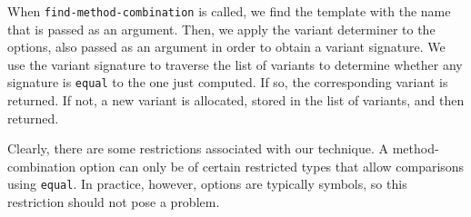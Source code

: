 When \texttt{find-method-combination} is called, we find the template
with the name that is passed as an argument.  Then, we apply the
variant determiner to the options, also passed as an argument in order
to obtain a variant signature.  We use the variant signature to
traverse the list of variants to determine whether any signature is
\texttt{equal} to the one just computed.  If so, the corresponding
variant is returned.  If not, a new variant is allocated, stored in
the list of variants, and then returned.

Clearly, there are some restrictions associated with our technique.  A
method-combination option can only be of certain restricted types that
allow comparisons using \texttt{equal}.  In practice, however, options
are typically symbols, so this restriction should not pose a problem.
